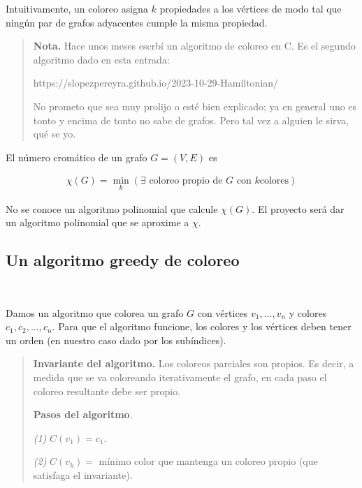 \documentclass[a4paper, 12pt]{article}
\begin{document}
Intuitivamente, un coloreo asigna $k$ propiedades a los vértices de modo tal que
ningún par de grafos adyacentes cumple la misma propiedad. 

\small
\begin{quote}

\textbf{Nota.} Hace unos meses escrbí un algoritmo de coloreo en C. Es el
segundo algoritmo dado en esta entrada: 

https://slopezpereyra.github.io/2023-10-29-Hamiltonian/

No prometo que sea muy prolijo o esté bien explicado; ya en general uno es tonto
y encima de tonto no sabe de grafos. Pero tal vez a alguien le sirva, qué se yo.

\end{quote}
\normalsize


\begin{definition}
    El número cromático de un grafo $G= (V, E) $ es 

    \begin{align*}
        \chi(G) = \min_k \left( \exists \text{ coloreo propio de $G$ con $k$
        colores} \right) 
    \end{align*}
\end{definition}

No se conoce un algoritmo polinomial que calcule $\chi(G)$. El proyecto será dar
un algoritmo polinomial que se aproxime a $\chi$.

\subsection{Un algoritmo greedy de coloreo}
~ ~ 

Damos un algoritmo que colorea un grafo $G$ con vértices $v_1, \ldots, v_n$ y
colores $ c_1, c_2, \ldots, c_n  $. Para que el algoritmo
funcione, los colores y los vértices deben tener un orden (en nuestro caso
dado por los subíndices).


\begin{quote}

\textbf{Invariante del algoritmo.} Los coloreos parciales son propios. Es decir,
a medida que se va coloreando iterativamente el grafo, en cada paso el coloreo
resultante debe ser propio.

\textbf{Pasos del algoritmo}. 

\textit{(1)} $C(v_1) = c_1$.

\textit{(2)} $C(v_k) = $ mínimo color que mantenga un coloreo propio (que
satisfaga el invariante).

\end{quote}
\end{document}

